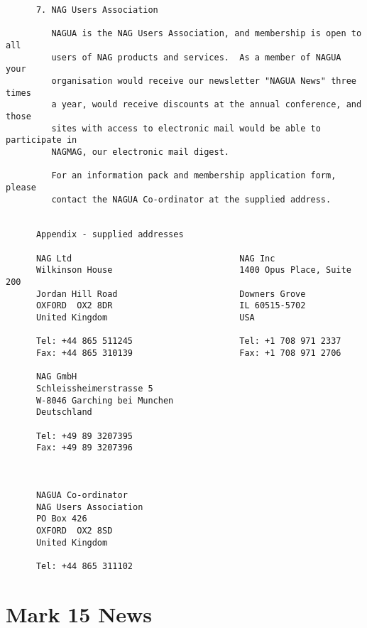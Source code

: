 \begin{small}
\begin{verbatim}
      7. NAG Users Association

         NAGUA is the NAG Users Association, and membership is open to all
         users of NAG products and services.  As a member of NAGUA your
         organisation would receive our newsletter "NAGUA News" three times
         a year, would receive discounts at the annual conference, and those
         sites with access to electronic mail would be able to participate in
         NAGMAG, our electronic mail digest.

         For an information pack and membership application form, please
         contact the NAGUA Co-ordinator at the supplied address.


      Appendix - supplied addresses

      NAG Ltd                                 NAG Inc
      Wilkinson House                         1400 Opus Place, Suite 200
      Jordan Hill Road                        Downers Grove
      OXFORD  OX2 8DR                         IL 60515-5702
      United Kingdom                          USA

      Tel: +44 865 511245                     Tel: +1 708 971 2337
      Fax: +44 865 310139                     Fax: +1 708 971 2706

      NAG GmbH
      Schleissheimerstrasse 5
      W-8046 Garching bei Munchen
      Deutschland

      Tel: +49 89 3207395
      Fax: +49 89 3207396



      NAGUA Co-ordinator
      NAG Users Association
      PO Box 426
      OXFORD  OX2 8SD
      United Kingdom

      Tel: +44 865 311102
\end{verbatim}
\end{small}

\newpage
\section{Mark 15 News}
\label{se:news}

